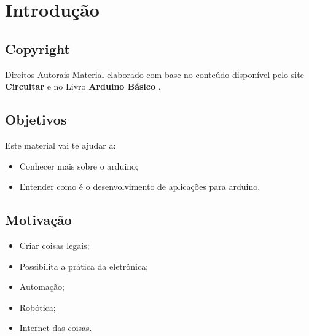 \section{Introdução}

\subsection*{Copyright}
\begin{frame}{}
	\begin{block}{Direitos Autorais}	
		Material elaborado com base no conteúdo disponível pelo site \textbf{Circuitar} \cite{Circuitar2017} e no Livro \textbf{Arduino Básico} \cite{mcroberts2015arduino}.
	\end{block}
\end{frame}

\subsection*{Objetivos}
\begin{frame}{}
	\begin{block}{Este material vai te ajudar a:}	
		\begin{itemize}
			\item Conhecer mais sobre o arduino;
			\item Entender como é o desenvolvimento de aplicações para arduino.
		\end{itemize}
	\end{block}
\end{frame}

\subsection*{Motivação}
\begin{frame}{}
	\begin{itemize}
		\item Criar coisas legais;
		\item Possibilita a prática da eletrônica;
		\item Automação;
		\item Robótica;
		\item Internet das coisas.
	\end{itemize}
\end{frame}


